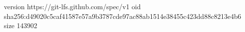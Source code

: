version https://git-lfs.github.com/spec/v1
oid sha256:d49020c5caf41587e57a9b3787cde97ac88ab1514e38455c423dd88c8213e4b6
size 143902
